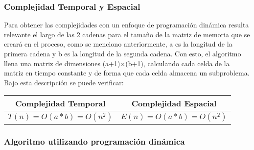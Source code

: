 \subsubsection{Complejidad Temporal y Espacial}

Para obtener las complejidades con un enfoque de programación dinámica resulta relevante el largo de las 2 cadenas para el tamaño de la matriz de memoria que se creará en el proceso, como se menciono anteriormente, a es la longitud de la primera cadena y b es la longitud de la segunda cadena. Con esto, el algoritmo llena una matriz de dimensiones (a+1)×(b+1), calculando cada celda de la matriz en tiempo constante y de forma que cada celda almacena un subproblema. Bajo esta descripción se puede verificar:

\begin{center}
\begin{tabular}{c|c}
\textbf{Complejidad Temporal} & \textbf{Complejidad Espacial} \\ \hline
$T(n) = O(a * b) = O(n^{2})$ & $E(n) = O(a * b) =  O(n^{2})$
\end{tabular}
\end{center}

\subsubsection{Algoritmo utilizando programación dinámica}

